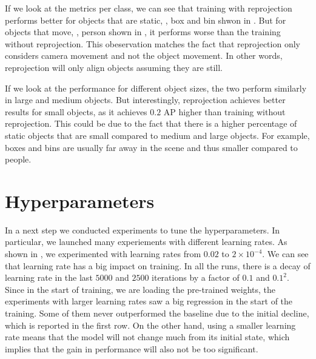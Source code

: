 If we look at the metrics per class, we can see that training with reprojection performs better for objects that are static, \eg, box and bin shwon in . But for objects that move, \eg, person shown in , it performs worse than the training without reprojection. This obeservation matches the fact that reprojection only considers camera movement and not the object movement. In other words, reprojection will only align objects assuming they are still. 

If we look at the performance for different object sizes, the two perform similarly in large and medium objects. But interestingly, reprojection achieves better results for small objects, as it achieves $0.2$ AP higher than training without reprojection. This could be due to the fact that there is a higher percentage of static objects that are small compared to medium and large objects. For example, boxes and bins are usually far away in the scene and thus smaller compared to people.

 




\section{Hyperparameters}
In a next step we conducted experiments to tune the hyperparameters. In particular, we launched many experiements with different learning rates. As shown in , we experimented with learning rates from $0.02$ to $2\times 10^{-4}$. We can see that learning rate has a big impact on training. In all the runs, there is a decay of learning rate in the last $5000$ and $2500$ iterations by a factor of $0.1$ and $0.1^2$. Since in the start of training, we are loading the pre-trained weights, the experiments with larger learning rates saw a big regression in the start of the training. Some of them never outperformed the baseline due to the initial decline, which is reported in the first row. On the other hand, using a smaller learning rate means that the model will not change much from its initial state, which implies that the gain in performance will also not be too significant. 


 